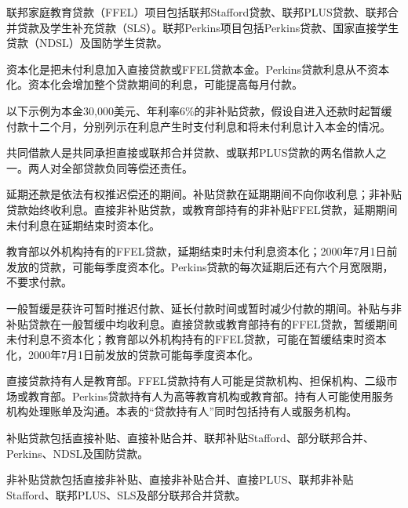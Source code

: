 \documentclass[UTF8,fontset=none,11pt,a4paper]{ctexart}
\begin{document}
联邦家庭教育贷款（FFEL）项目包括联邦Stafford贷款、联邦PLUS贷款、联邦合并贷款及学生补充贷款（SLS）。联邦Perkins项目包括Perkins贷款、国家直接学生贷款（NDSL）及国防学生贷款。


资本化是把未付利息加入直接贷款或FFEL贷款本金。Perkins贷款利息从不资本化。资本化会增加整个贷款期间的利息，可能提高每月付款。


以下示例为本金30,000美元、年利率6\%的非补贴贷款，假设自进入还款时起暂缓付款十二个月，分别列示在利息产生时支付利息和将未付利息计入本金的情况。


共同借款人是共同承担直接或联邦合并贷款、或联邦PLUS贷款的两名借款人之一。两人对全部贷款负同等偿还责任。


延期还款是依法有权推迟偿还的期间。补贴贷款在延期期间不向你收利息；非补贴贷款始终收利息。直接非补贴贷款，或教育部持有的非补贴FFEL贷款，延期期间未付利息在延期结束时资本化。


教育部以外机构持有的FFEL贷款，延期结束时未付利息资本化；2000年7月1日前发放的贷款，可能每季度资本化。Perkins贷款的每次延期后还有六个月宽限期，不要求付款。


一般暂缓是获许可暂时推迟付款、延长付款时间或暂时减少付款的期间。补贴与非补贴贷款在一般暂缓中均收利息。直接贷款或教育部持有的FFEL贷款，暂缓期间未付利息不资本化；教育部以外机构持有的FFEL贷款，可能在暂缓结束时资本化，2000年7月1日前发放的贷款可能每季度资本化。


直接贷款持有人是教育部。FFEL贷款持有人可能是贷款机构、担保机构、二级市场或教育部。Perkins贷款持有人为高等教育机构或教育部。持有人可能使用服务机构处理账单及沟通。本表的“贷款持有人”同时包括持有人或服务机构。


补贴贷款包括直接补贴、直接补贴合并、联邦补贴Stafford、部分联邦合并、Perkins、NDSL及国防贷款。


非补贴贷款包括直接非补贴、直接非补贴合并、直接PLUS、联邦非补贴Stafford、联邦PLUS、SLS及部分联邦合并贷款。
\end{document}
